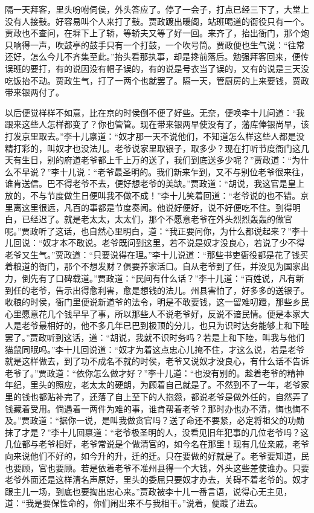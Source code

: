 \begin{parag}
    隔一天拜客，里头吩咐伺侯，外头答应了。停了一会子，打点已经三下了，大堂上没有人接鼓。好容易叫个人来打了鼓。贾政踱出暖阁，站班喝道的衙役只有一个。贾政也不查问，在墀下上了轿，等轿夫又等了好一回。来齐了，抬出衙门，那个炮只响得一声，吹鼓亭的鼓手只有一个打鼓，一个吹号筒。贾政便也生气说：“往常还好，怎么今儿不齐集至此。”抬头看那执事，却是搀前落后。勉强拜客回来，便传误班的要打，有的说因没有帽子误的，有的说是号衣当了误的，又有的说是三天没吃饭抬不动。贾政生气，打了一两个也就罢了。隔一天，管厨房的上来要钱，贾政带来银两付了。
\end{parag}


\begin{parag}
    以后便觉样样不如意，比在京的时侯倒不便了好些。无奈，便唤李十儿问道：“我跟来这些人怎样都变了？你也管管。现在带来银两早使没有了，藩库俸银尚早，该打发京里取去。”李十儿禀道：“奴才那一天不说他们，不知道怎么样这些人都是没精打彩的，叫奴才也没法儿。老爷说家里取银子，取多少？现在打听节度衙门这几天有生日，别的府道老爷都上千上万的送了，我们到底送多少呢？”贾政道：“为什么不早说？”李十儿说：“老爷最圣明的。我们新来乍到，又不与别位老爷很来往，谁肯送信。巴不得老爷不去，便好想老爷的美缺。”贾政道：“胡说，我这官是皇上放的，不与节度做生日便叫我不做不成！”李十儿笑着回道：“老爷说的也不错。京里离这里很远，凡百的事都是节度奏闻。他说好便好，说不好便吃不住。到得明白，已经迟了。就是老太太，太太们，那个不愿意老爷在外头烈烈轰轰的做官呢。”贾政听了这话，也自然心里明白，道：“我正要问你，为什么都说起来？”李十儿回说：“奴才本不敢说。老爷既问到这里，若不说是奴才没良心，若说了少不得老爷又生气。”贾政道：“只要说得在理。”李十儿说道：“那些书吏衙役都是花了钱买着粮道的衙门，那个不想发财？俱要养家活口。自从老爷到了任，并没见为国家出力，倒先有了口碑载道。”贾政道：“民间有什么话？”李十儿道：“百姓说，凡有新到任的老爷，告示出得愈利害，愈是想钱的法儿。州县害怕了，好多多的送银子。收粮的时侯，衙门里便说新道爷的法令，明是不敢要钱，这一留难叨蹬，那些乡民心里愿意花几个钱早早了事，所以那些人不说老爷好，反说不谙民情。便是本家大人是老爷最相好的，他不多几年已巴到极顶的分儿，也只为识时达务能够上和下睦罢了。”贾政听到这话，道：“胡说，我就不识时务吗？若是上和下睦，叫我与他们猫鼠同眠吗。”李十儿回说道：“奴才为着这点忠心儿掩不住，才这么说，若是老爷就是这样做去，到了功不成名不就的时侯，老爷又说奴才没良心，有什么话不告诉老爷了。”贾政道：“依你怎么做才好？”李十儿道：“也没有别的。趁着老爷的精神年纪，里头的照应，老太太的硬朗，为顾着自己就是了。不然到不了一年，老爷家里的钱也都贴补完了，还落了自上至下的人抱怨，都说老爷是做外任的，自然弄了钱藏着受用。倘遇着一两件为难的事，谁肯帮着老爷？那时办也办不清，悔也悔不及。”贾政道：“据你一说，是叫我做贪官吗？送了命还不要紧，必定将祖父的功勋抹了才是？”李十儿回禀道：“老爷极圣明的人，没看见旧年犯事的几位老爷吗？这几位都与老爷相好，老爷常说是个做清官的，如今名在那里！现有几位亲戚，老爷向来说他们不好的，如今升的升，迁的迁。只在要做的好就是了。老爷要知道，民也要顾，官也要顾。若是依着老爷不准州县得一个大钱，外头这些差使谁办。只要老爷外面还是这样清名声原好，里头的委屈只要奴才办去，关碍不着老爷的。奴才跟主儿一场，到底也要掏出忠心来。”贾政被李十儿一番言语，说得心无主见，道：“我是要保性命的，你们闹出来不与我相干。”说着，便踱了进去。
\end{parag}



